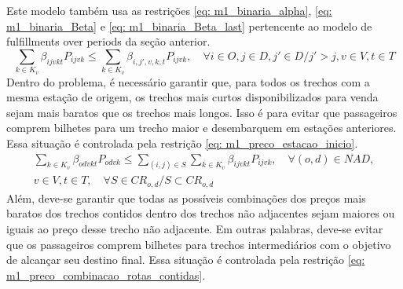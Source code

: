Este modelo também usa as restrições \eqref{eq: m1_binaria_alpha}, \eqref{eq: m1_binaria_Beta} e
\eqref{eq: m1_binaria_Beta_last} pertencente ao modelo de fulfillments over periods da seção anterior.
\begin{equation}
	\sum_{k \in K_v}\beta_{ijvkt}P_{ijvk} \leq \sum_{k \in K_v}\beta_{i,j',v,k,t}P_{ijvk}, \quad \forall i \in O, j \in D, j' \in D / j' > j, v \in V, t \in T    \label{eq: m1_preco_estacao_inicio}
\end{equation}
Dentro do problema, é necessário garantir que, para todos os trechos com a mesma estação de origem, os trechos mais curtos disponibilizados para venda sejam mais baratos que os trechos mais longos. Isso é para evitar que passageiros comprem bilhetes para um trecho maior e desembarquem em estações anteriores. Essa situação é controlada pela restrição \eqref{eq: m1_preco_estacao_inicio}.
\begin{equation}
	\begin{split}
		\sum_{k \in K_v}\beta_{odvkt}P_{odvk} \leq \sum_{(i,j) \in S}\sum_{k \in K_v}\beta_{ijvkt}P_{ijvk}, \quad    \forall (o,d) \in NAD, \\
		v \in V, t \in T , \quad  \forall S \in CR_{o,d} / S \subset CR_{o,d}   \label{eq: m1_preco_combinacao_rotas_contidas}
	\end{split}
\end{equation}
Além, deve-se garantir que todas as possíveis combinações dos preços mais baratos dos trechos contidos dentro dos trechos não adjacentes sejam maiores ou iguais ao preço desse trecho não adjacente. Em outras palabras, deve-se evitar que os passageiros comprem bilhetes para trechos intermediários com o objetivo de alcançar seu destino final. Essa situação é controlada pela restrição \eqref{eq: m1_preco_combinacao_rotas_contidas}.

